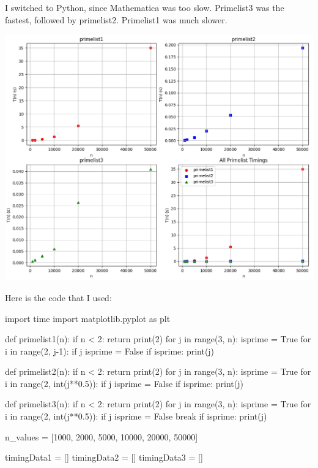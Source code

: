 \documentclass[11pt,twoside,openany]{memoir}
\begin{document}
        \begin{solution}
            I switched to Python, since Mathematica was too slow. Primelist3 was the fastest, followed by primelist2. Primelist1 was much slower.
            \begin{center}
                \includegraphics[scale=.6]{Figure_1}
            \end{center}
            \newpage Here is the code that I used:
                \begin{python}
import time
import matplotlib.pyplot as plt

def primelist1(n):
    if n < 2:
        return
    print(2)
    for j in range(3, n):
        isprime = True
        for i in range(2, j-1):
            if j %
                isprime = False
        if isprime:
            print(j)

def primelist2(n):
    if n < 2:
        return
    print(2)
    for j in range(3, n):
        isprime = True
        for i in range(2, int(j**0.5)):
            if j %
                isprime = False
        if isprime:
            print(j)

def primelist3(n):
    if n < 2:
        return
    print(2)
    for j in range(3, n):
        isprime = True
        for i in range(2, int(j**0.5)):
            if j %
                isprime = False
                break
        if isprime:
            print(j)

n_values = [1000, 2000, 5000, 10000, 20000, 50000]

timingData1 = []
timingData2 = []
timingData3 = []


\end{python}
\end{solution}
\end{document}
